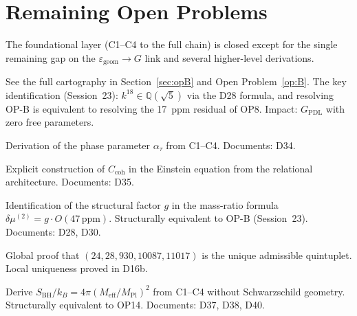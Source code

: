\documentclass[12pt,a4paper]{article}
\theoremstyle{plain}
\theoremstyle{definition}
\theoremstyle{remark}
\newenvironment{openproblem}[1][]{%
  \begin{tcolorbox}[openproblemstyle,title={Open Problem\ifx\relax#1\relax\else: #1\fi}]}{\end{tcolorbox}}
\newcommand{\MPl}{M_{\mathrm{Pl}}}
\newcommand{\Meff}{M_{\mathrm{eff}}}
\newcommand{\SBH}{S_{\mathrm{BH}}}
\newcommand{\egeom}{\varepsilon_{\mathrm{geom}}}
\begin{document}
\section{Remaining Open Problems}
\label{sec:open}

The foundational layer (C1--C4 to the full chain) is closed except for the single remaining gap on the $\egeom\to G$ link and several higher-level derivations.

\begin{openproblem}[OP-B --- Derivation of $k$ from axioms]
See the full cartography in Section~\ref{sec:opB} and Open Problem~\ref{op:B}. The key identification (Session~23): $k^{18}\in\mathbb{Q}(\sqrt{5})$ via the D28 formula, and resolving OP-B is equivalent to resolving the 17~ppm residual of OP8. Impact: $G_{\mathrm{PDL}}$ with zero free parameters.
\end{openproblem}

\begin{openproblem}[OP2 --- Born rule Level~2]
Derivation of the phase parameter $\alpha_\tau$ from C1--C4. Documents: D34.
\end{openproblem}

\begin{openproblem}[OP4 --- Coherence stress tensor]
Explicit construction of $C_{\mathrm{coh}}$ in the Einstein equation from the relational architecture. Documents: D35.
\end{openproblem}

\begin{openproblem}[OP8 --- The 47~ppm residual]
Identification of the structural factor $g$ in the mass-ratio formula $\delta\mu^{(2)}=g\cdot O(47\,\mathrm{ppm})$. Structurally equivalent to OP-B (Session~23). Documents: D28, D30.
\end{openproblem}

\begin{openproblem}[OP11 --- Global uniqueness of the proton quintuplet]
Global proof that $(24,28,930,10087,11017)$ is the unique admissible quintuplet. Local uniqueness proved in D16b.
\end{openproblem}

\begin{openproblem}[OP12 / BH-3 --- Bekenstein--Hawking from axioms]
Derive $\SBH/k_B=4\pi(\Meff/\MPl)^2$ from C1--C4 without Schwarzschild geometry. Structurally equivalent to OP14. Documents: D37, D38, D40.
\end{openproblem}
\end{document}
